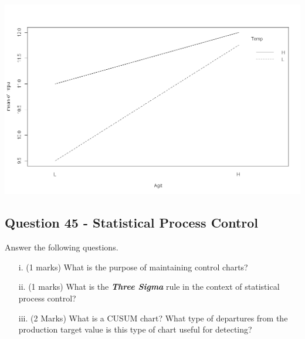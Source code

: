 \documentclass[a4paper,12pt]{article}
\begin{document}
\begin{center}
	\includegraphics[scale=0.3]{images/ExamQ6interactionc}
\end{center}

\newpage
\subsection*{Question 45 - Statistical Process Control}
Answer the following questions.

\begin{itemize}
	\item[i.] (1 marks) What is the purpose of maintaining control charts?
	\item[ii.] (1 marks) What is the \emph{\textbf{Three Sigma}} rule in the context of statistical process control?
	\item[iii.] (2 Marks) What is a CUSUM chart? What type of departures from the production target value
	is this type of chart useful for detecting?
\end{itemize}
\end{document}
